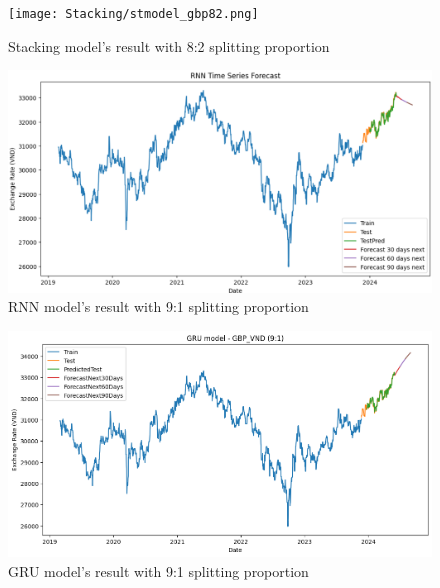 \documentclass{ieeeojies}
\begin{document}
\begin{figure}[H]
  \centering
  \begin{minipage}{0.8\linewidth}
    \centering
    \texttt{[image: Stacking/stmodel\_gbp82.png]}
    \caption{Stacking model's result with 8:2 splitting proportion}
    \label{fig21}
  \end{minipage}
\end{figure}
\begin{figure}[H]
  \centering
  \begin{minipage}{0.8\linewidth}
    \centering
    \includegraphics[width=\linewidth]{RNN/rnn_gbp_91.png}
    \caption{RNN model's result with 9:1 splitting proportion}
    \label{fig22}
  \end{minipage}
\end{figure}
\begin{figure}[H]
  \centering
  \begin{minipage}{0.8\linewidth}
    \centering
    \includegraphics[width=\linewidth]{GRU/GRU_gbp_91.png}
    \caption{GRU model's result with 9:1 splitting proportion}
    \label{fig23}
  \end{minipage}
\end{figure}
\end{document}
